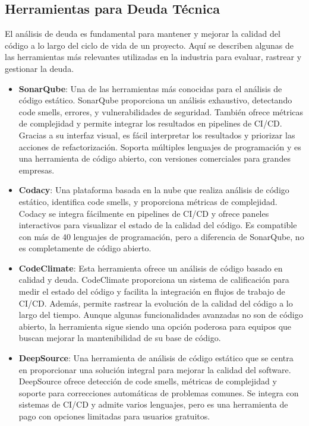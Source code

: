 \subsection{Herramientas para Deuda Técnica}
El análisis de \gls{deuda} es fundamental para mantener y mejorar la calidad del código a lo largo del ciclo de vida de un proyecto. Aquí se describen algunas de las herramientas más relevantes utilizadas en la industria para evaluar, rastrear y gestionar la \gls{deuda}.
\begin{itemize}
    \item \textbf{SonarQube}: Una de las herramientas más conocidas para el análisis de código estático. SonarQube proporciona un análisis exhaustivo, detectando code smells, errores, y vulnerabilidades de seguridad. También ofrece métricas de complejidad y permite integrar los resultados en pipelines de CI/CD. Gracias a su interfaz visual, es fácil interpretar los resultados y priorizar las acciones de refactorización. Soporta múltiples lenguajes de programación y es una herramienta de código abierto, con versiones comerciales para grandes empresas.
    \item \textbf{Codacy}: Una plataforma basada en la nube que realiza análisis de código estático, identifica code smells, y proporciona métricas de complejidad. Codacy se integra fácilmente en pipelines de CI/CD y ofrece paneles interactivos para visualizar el estado de la calidad del código. Es compatible con más de 40 lenguajes de programación, pero a diferencia de SonarQube, no es completamente de código abierto.
    \item \textbf{CodeClimate}: Esta herramienta ofrece un análisis de código basado en calidad y \gls{deuda}. CodeClimate proporciona un sistema de calificación para medir el estado del código y facilita la integración en flujos de trabajo de CI/CD. Además, permite rastrear la evolución de la calidad del código a lo largo del tiempo. Aunque algunas funcionalidades avanzadas no son de código abierto, la herramienta sigue siendo una opción poderosa para equipos que buscan mejorar la mantenibilidad de su base de código.
    \item \textbf{DeepSource}: Una herramienta de análisis de código estático que se centra en proporcionar una solución integral para mejorar la calidad del software. DeepSource ofrece detección de code smells, métricas de complejidad y soporte para correcciones automáticas de problemas comunes. Se integra con sistemas de CI/CD y admite varios lenguajes, pero es una herramienta de pago con opciones limitadas para usuarios gratuitos.

\end{itemize}

